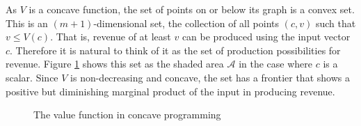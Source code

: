 As $V$ is a concave function, the set of points on or below its graph is a convex set. This is an $(m + 1)$-dimensional set, the collection of all points $(c, v)$ such that $v \leq V(c)$. That is, revenue of at least $v$ can be produced using the input vector $c$. Therefore it is natural to think of it as the set of production possibilities for revenue. Figure \ref{Fig7.1} shows this set as the shaded area $\mathcal{A}$ in the case where $c$ is a scalar. Since $V$ is non-decreasing and concave, the set has a frontier that shows a positive but diminishing marginal product of the input in producing revenue. 
\begin{figure}[!htb] %
\centering %
\caption{The value function in concave programming} %
\label{Fig7.1} %
\end{figure}

